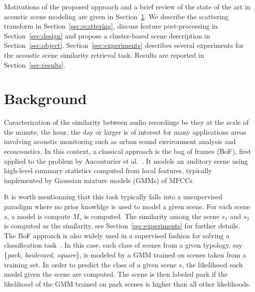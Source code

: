 \documentclass[smallextended]{svjour3}
\begin{document}
Motivations of the proposed approach and a brief review of the state of the art in acoustic scene modeling are given in Section~\ref{sec:soa}. We describe the scattering transform in Section~\ref{sec:scattering}, discuss feature post-processing in Section~\ref{sec:design} and propose a cluster-based scene description in Section~\ref{sec:object}. Section~\ref{sec:experiments} describes several experiments for the acoustic scene similarity retrieval task. Results are reported in Section~\ref{sec:results}.

\section{Background} \label{sec:soa}


Caracterization of the similarity between audio recordings be they at the scale of the minute, the hour, the day or larger is of interest for many applications areas involving acoustic monitoring such as urban sound environment analysis and ecoacoustics. In this context, a classical approach is the bag of frames (BoF), first applied to the problem by Aucouturier et al.~\cite{aucouturier2007bag}.
It models an auditory scene using high-level summary statistics computed from local features, typically implemented by Gaussian mixture models (GMMs) of MFCCs.

It is worth mentionning that this task typically falls into a unsupervised paradigm where no prior knowldge is used to model a given scene. For each scene $s$, a model is compute $M_s$ is computed. The similarity among the scene $s_1$ and $s_2$ is computed as the similarity, see Section~\ref{sec:experiments} for further details. The BoF approach is also widely used in a supervised fashion for solving a classification task~\cite{7100934}. In this case, each class of scenes from a given typology, say \{\emph{park, boulevard, square}\}, is modeled by a GMM trained on scenes taken from a training set. In order to predict the class of a given scene $s$, the likelihood each model given the scene are computed. The scene is then labeled park if the likelihood of the GMM trained on park scenes is higher than all other likelihoods.
\end{document}
